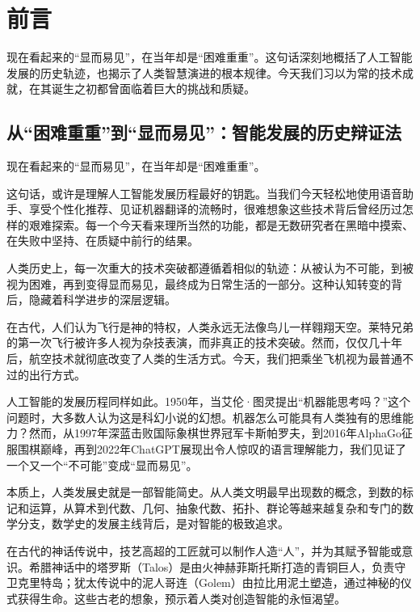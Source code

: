 \chapter*{ 前言}


\begin{introduction}

\item 现在看起来的“显而易见”，在当年却是“困难重重”。这句话深刻地概括了人工智能发展的历史轨迹，也揭示了人类智慧演进的根本规律。今天我们习以为常的技术成就，在其诞生之初都曾面临着巨大的挑战和质疑。

\end{introduction}

\section{从“困难重重”到“显而易见”：智能发展的历史辩证法}

现在看起来的“显而易见”，在当年却是“困难重重”。

这句话，或许是理解人工智能发展历程最好的钥匙。当我们今天轻松地使用语音助手、享受个性化推荐、见证机器翻译的流畅时，很难想象这些技术背后曾经历过怎样的艰难探索。每一个今天看来理所当然的功能，都是无数研究者在黑暗中摸索、在失败中坚持、在质疑中前行的结果。

人类历史上，每一次重大的技术突破都遵循着相似的轨迹：从被认为不可能，到被视为困难，再到变得显而易见，最终成为日常生活的一部分。这种认知转变的背后，隐藏着科学进步的深层逻辑。

在古代，人们认为飞行是神的特权，人类永远无法像鸟儿一样翱翔天空。莱特兄弟的第一次飞行被许多人视为杂技表演，而非真正的技术突破。然而，仅仅几十年后，航空技术就彻底改变了人类的生活方式。今天，我们把乘坐飞机视为最普通不过的出行方式。

人工智能的发展历程同样如此。1950年，当艾伦·图灵提出“机器能思考吗？”这个问题时，大多数人认为这是科幻小说的幻想。机器怎么可能具有人类独有的思维能力？然而，从1997年深蓝击败国际象棋世界冠军卡斯帕罗夫，到2016年AlphaGo征服围棋巅峰，再到2022年ChatGPT展现出令人惊叹的语言理解能力，我们见证了一个又一个“不可能”变成“显而易见”。

本质上，人类发展史就是一部智能简史。从人类文明最早出现数的概念，到数的标记和运算，从算术到代数、几何、抽象代数、拓扑、群论等越来越复杂和专门的数学分支，数学史的发展主线背后，是对智能的极致追求。

在古代的神话传说中，技艺高超的工匠就可以制作人造“人”，并为其赋予智能或意识。希腊神话中的塔罗斯（Talos）是由火神赫菲斯托斯打造的青铜巨人，负责守卫克里特岛；犹太传说中的泥人哥连（Golem）由拉比用泥土塑造，通过神秘的仪式获得生命。这些古老的想象，预示着人类对创造智能的永恒渴望。

